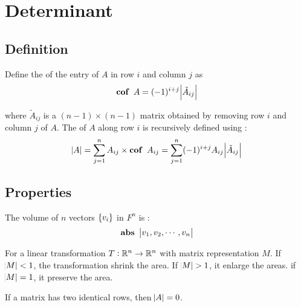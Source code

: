 \chapter{Determinant}


\section{Definition}

\begin{definition}
    Define the  of the entry of $A$ in row $i$ and column $j$ as
    \begin{equation}
        \displaystyle \mathop{\bf cof\/}~\displaystyle A = (-1)^{i+j}\abs{\tilde{A}_{ij}}
    \end{equation}
    
    where $\tilde{A}_{ij}$ is a $(n-1)\times (n-1)$ matrix obtained by removing row $i$ and column $j$ of $A$. The  of $A$ along row $i$ is recursively defined using :
    \begin{equation}
    \abs{A} = \sum_{j=1}^n A_{ij} \times \displaystyle \mathop{\bf cof\/}~\displaystyle A_{ij} = \sum_{j=1}^n (-1)^{i+j} A_{ij}  \abs{\tilde{A}_{ij}}
    \end{equation}
\end{definition}




\section{Properties}

\begin{theorem}
    The volume of $n$ vectors $\set{v_i}$ in $F^n$ is :
    \begin{equation}
      \mathop{\bf abs\/}~\begin{vmatrix}
            v_1, v_2, \cdots,  v_n
        \end{vmatrix}
    \end{equation}
\end{theorem}

\begin{theorem}
    For a linear transformation $T: \mathbb{R}^n \rightarrow \mathbb{R}^n$ with matrix representation $M$. If $\abs{M} < 1$, the transformation shrink the area. If $\abs{M} > 1$, it enlarge the areas. if $\abs{M} = 1$, it preserve the area.
\end{theorem}


\begin{theorem}
    If a matrix has two identical rows, then $\abs{A} = 0$.
\end{theorem}


